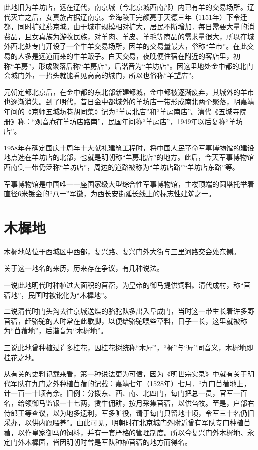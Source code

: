 此地旧为羊坊店，远在辽代，南京城（今北京城西南部）内已有羊的交易场所。辽代灭亡之后，女真族占据辽南京。金海陵王完颜亮于天德三年（1151年）下令迁都，同时扩建燕京城。由于城市规模相对扩大，居民不断增加，每日需要大量的消费品，且女真族为游牧民族，对羊肉、羊皮、羊毛等商品的需求量很大，所以在城外西北处专门开设了一个牛羊交易场所，因羊的交易量最大，俗称“羊市”。在此交易的人多是远道而来的牛羊贩子。白天交易，夜晚便住宿在附近的客店里，初称“羊房”，形成聚落后称“羊房店”，后谐音为“羊坊店”。因这里地处金中都的北门会城门外，一抬头就能看见高高的城门，所以也俗称“羊望店”。

元朝定都北京后，在金中都的东北部新建都城，金中都被逐渐废弃，其城外的羊市也逐渐消失。到了明代，昔日金中都城外的羊坊店一带形成南北两个聚落，明嘉靖年间的《京师五城坊巷胡同集》记为“羊房北店”和“羊房南店”。清代《五城寺院册》称：“观音庵在羊坊店路南”，民国年间称“羊房店”，1949年以后复称“羊坊店”。

1958年在确定国庆十周年十大献礼建筑工程时，将中国人民革命军事博物馆的建设地点选在羊坊店的北部，也就是明朝称“羊房北店”的地方。此后，今天军事博物馆西南侧一带仍泛称“羊坊店”，周边的道路被称为“羊坊店路”“羊坊店东路”等。

军事博物馆是中国唯一一座国家级大型综合性军事博物馆，主楼顶端的圆塔托举着直径6米镀金的“八一”军徽，为西长安街延长线上的标志性建筑之一。

\section{木樨地}
木樨地站位于西城区中西部，复兴路、复兴门外大街与三里河路交会处东侧。

关于这一地名的来历，历来存在争议，有几种说法。

一说此地明代时种植过大面积的苜蓿，为皇帝的御马提供饲料。清代成村，称“苜蓿地”，民国时被讹化为“木樨地”。

二说清代时门头沟去往京城送煤的骆驼队多出入阜成门，当时这一带生长着许多野苜蓿，赶骆驼的人时常在此歇脚，以便给骆驼喂些草料，日子一长，这里就被称为“苜蓿地”，后谐音为“木樨地”。

三说此地曾种植过许多桂花，因桂花树统称“木犀”，“樨”与“犀”同音义，木樨地即桂花之地。

从有关的史料记载来看，第一种说法更为可信，因为《明世宗实录》中就有关于明代军队在九门之外种植苜蓿的记载：嘉靖七年（1528年）七月，“九门苜蓿地上，计一百一十顷有余。旧例：分拨东、西、南、北四门，每门把总一员，官军一百名，给领御马监银一十七两，赁牛佣耕，按月采集苜蓿，以供刍牧。至是，户部右侍郎王等查议，以为地多遗利，军多旷役，请于每门只留地十顷，令军三十名仍旧采办，以供内厩喂养”。由此可见，明朝时在北京城门外附近曾有军队专门种植苜蓿，以作皇家御马的饲料，并有一套严格的管理制度。所以今复兴门外木樨地、永定门外木樨园，皆因明朝时曾是军队种植苜蓿的地方而得名。

